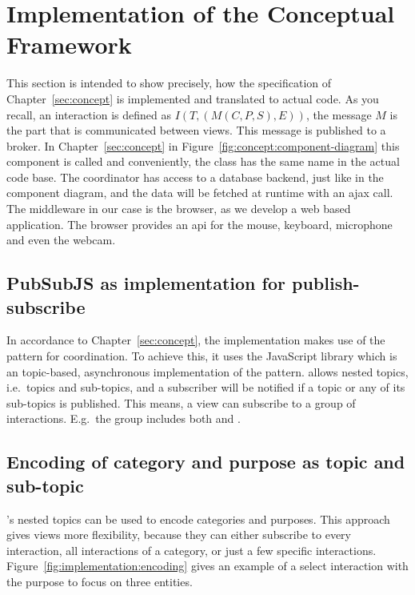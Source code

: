 \section{Implementation of the Conceptual Framework}\label{sec:implementation:concept-translation}
This section is intended to show precisely, how the specification of Chapter~\ref{sec:concept} is implemented and translated to actual code.
As you recall, an interaction is defined as $I(T,(M(C,P,S),E))$, the message $M$ is the part that is communicated between views.
This message is published to a  broker.
In Chapter~\ref{sec:concept} in Figure~\ref{fig:concept:component-diagram} this component is called  and conveniently, the class has the same name in the actual code base.
The coordinator has access to a database backend, just like in the component diagram, and the data will be fetched at runtime with an \gls{ajax} call.
The  middleware in our case is the browser, as we develop a web based application.
The browser provides an \gls{api} for the mouse, keyboard, microphone and even the webcam.

\subsection{PubSubJS as implementation for publish-subscribe}
In accordance to Chapter~\ref{sec:concept}, the implementation makes use of the  pattern for coordination.
To achieve this, it uses the JavaScript library  which is an topic-based, asynchronous implementation of the pattern.
 allows nested topics, i.e.\ topics and sub-topics, and a subscriber will be notified if a topic or any of its sub-topics is published.
This means, a view can subscribe to a group of interactions.
E.g.\ the group  includes both  and .

\subsection{Encoding of category and purpose as topic and sub-topic}\label{sec:implementationnceptual Framework}\label{sec:implementation:concept:translation:subject-purpose}
's nested topics can be used to encode categories and purposes.
This approach gives views more flexibility, because they can either subscribe to every interaction, all interactions of a category, or just a few specific interactions.
Figure~\ref{fig:implementation:encoding} gives an example of a select interaction with the purpose to focus on three entities.

